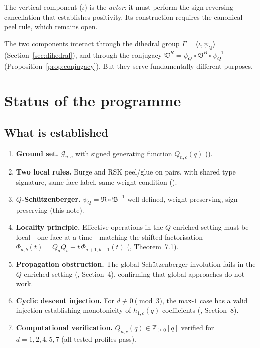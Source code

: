 \documentclass[11pt]{article}
\newcommand{\Z}{\mathbb{Z}}
\theoremstyle{plain}
\theoremstyle{definition}
\begin{document}
The vertical component ($\iota$) is the \emph{actor}: it must
perform the sign-reversing cancellation that establishes
positivity.  Its construction requires the canonical peel rule,
which remains open.

The two components interact through the dihedral group
$\Gamma = \langle \iota, \psi_Q \rangle$
(Section~\ref{sec:dihedral}), and through the conjugacy
$\mathfrak{V}^R = \psi_Q \circ \mathfrak{V}^B \circ \psi_Q^{-1}$
(Proposition~\ref{prop:conjugacy}).  But they serve fundamentally
different purposes.


\section{Status of the programme}
\label{sec:status}

\subsection{What is established}

\begin{enumerate}
  \item \textbf{Ground set.}\;
    $\mathcal{G}_{n,c}$ with signed generating function
    $Q_{n,c}(q)$ (\cite{UNDERLYING_SET, FIRST_ATTEMPT}).

  \item \textbf{Two local rules.}\;
    Burge and RSK peel/glue on pairs, with shared type
    signature, same face label, same weight condition
    (\cite{Q_LOCAL}).

  \item \textbf{$Q$-Sch\"utzenberger.}\;
    $\psi_Q = \mathfrak{R} \circ \mathfrak{B}^{-1}$
    well-defined, weight-preserving, sign-preserving
    (this note).

  \item \textbf{Locality principle.}\;
    Effective operations in the $Q$-enriched setting must be
    local---one face at a time---matching the shifted
    factorisation $\Phi_{a,b}(t) = Q_a Q_b + t\,\Phi_{a+1,b+1}(t)$
    (\cite{LOCAL_RULE}, Theorem~7.1).

  \item \textbf{Propagation obstruction.}\;
    The global Sch\"utzenberger involution fails in the
    $Q$-enriched setting (\cite{LOCAL_RULE}, Section~4),
    confirming that global approaches do not work.

  \item \textbf{Cyclic descent injection.}\;
    For $d \not\equiv 0 \pmod{3}$, the max-$1$ case has a valid
    injection establishing monotonicity of $h_{1,c}(q)$
    coefficients (\cite{NOTES}, Section~8).

  \item \textbf{Computational verification.}\;
    $Q_{n,c}(q) \in \Z_{\geq 0}[q]$ verified for
    $d = 1, 2, 4, 5, 7$ (all tested profiles pass).
\end{enumerate}
\end{document}
